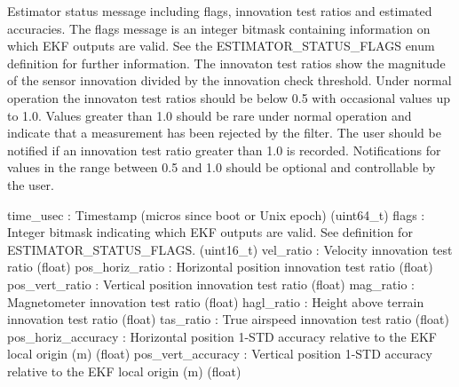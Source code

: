 \begin{DoxyVerb}
\begin{DoxyVerb}
\begin{DoxyVerb}Estimator status message including flags, innovation test ratios and
estimated accuracies. The flags message is an integer
bitmask containing information on which EKF outputs
are valid. See the ESTIMATOR_STATUS_FLAGS enum
definition for further information. The innovaton test
ratios show the magnitude of the sensor innovation
divided by the innovation check threshold. Under
normal operation the innovaton test ratios should be
below 0.5 with occasional values up to 1.0. Values
greater than 1.0 should be rare under normal operation
and indicate that a measurement has been rejected by
the filter. The user should be notified if an
innovation test ratio greater than 1.0 is recorded.
Notifications for values in the range between 0.5 and
1.0 should be optional and controllable by the user.

time_usec                 : Timestamp (micros since boot or Unix epoch) (uint64_t)
flags                     : Integer bitmask indicating which EKF outputs are valid. See definition for ESTIMATOR_STATUS_FLAGS. (uint16_t)
vel_ratio                 : Velocity innovation test ratio (float)
pos_horiz_ratio           : Horizontal position innovation test ratio (float)
pos_vert_ratio            : Vertical position innovation test ratio (float)
mag_ratio                 : Magnetometer innovation test ratio (float)
hagl_ratio                : Height above terrain innovation test ratio (float)
tas_ratio                 : True airspeed innovation test ratio (float)
pos_horiz_accuracy        : Horizontal position 1-STD accuracy relative to the EKF local origin (m) (float)
pos_vert_accuracy         : Vertical position 1-STD accuracy relative to the EKF local origin (m) (float)\end{DoxyVerb}
 \mbox{\label{classpymavlink_1_1dialects_1_1v10_1_1MAVLink_ae540163fd6b4b1ee8534143aa26b0cab}} 

\end{DoxyVerb}
\end{DoxyVerb}
